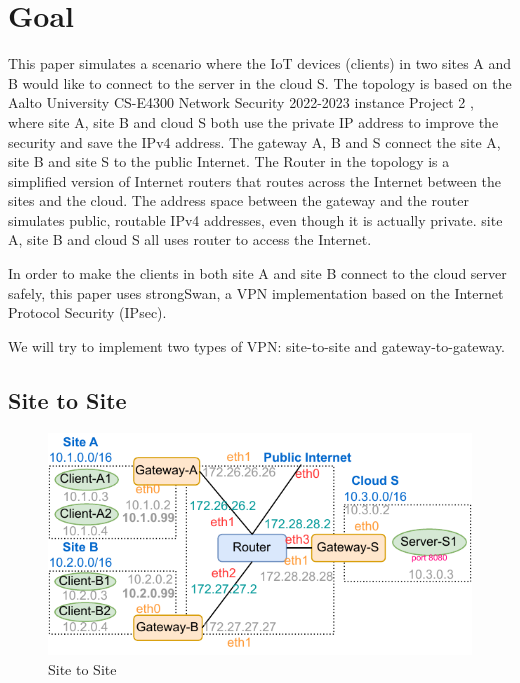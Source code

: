 \documentclass[article]{aaltoseries}
\begin{document}



\section{Goal}

This paper simulates a scenario where the IoT devices (clients) in two sites A and B would like to connect to the server in the cloud S. The topology is based on the Aalto University CS-E4300 Network Security 2022-2023 instance Project 2 \cite{aura_peltonen_bui_2022}, where site A, site B and cloud S both use the private IP address to improve the security and save the IPv4 address. The gateway A, B and S connect the site A, site B and site S to the public Internet. The Router in the topology is a simplified version of Internet routers that routes across the Internet between the sites and the cloud. The address space between the gateway and the router simulates public, routable IPv4 addresses, even though it is actually private. site A, site B and cloud S all uses router to access the Internet.

In order to make the clients in both site A and site B connect to the cloud server safely, this paper uses strongSwan, a VPN implementation based on the Internet Protocol Security (IPsec).

We will try to implement two types of VPN: site-to-site and gateway-to-gateway.

\subsection{Site to Site}
\begin{figure}[t!]
  \begin{center}
    \includegraphics[width=1.1\textwidth]{figures/site-to-site.pdf}
    \caption{Site to Site}
    \label{fig:site2site}
  \end{center}
\end{figure}
\end{document}
